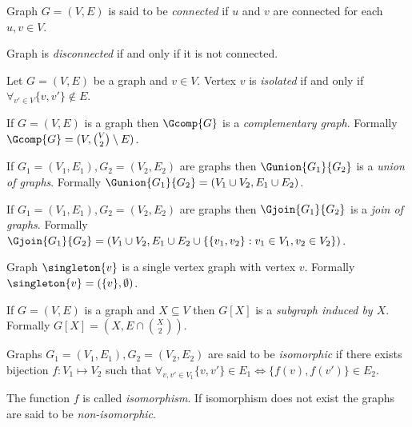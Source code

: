 \begin{defi}
    Graph $G = (V,E)$ is said to be \emph{connected} if $u$ and $v$ are connected for each $u,v \in V$.

    Graph is \emph{disconnected} if and only if it is not connected.
\end{defi}

\begin{defi}
    Let $G = (V,E)$ be a graph and $v \in V$. Vertex $v$ is \emph{isolated} if and only if $\forall_{v' \in V} \{v,v'\} \not\in E$.
\end{defi}

\begin{defi}
    If $G = (V, E)$ is a graph then $\Gcomp{G}$ is a \emph{complementary graph}. Formally $\Gcomp{G} = (V, \binom{V}{2} \setminus E)$.
\end{defi}
\begin{defi}
    If $G_1 = (V_1, E_1), G_2 = (V_2, E_2)$ are graphs then $\Gunion{G_1}{G_2}$ is a \emph{union of graphs}. Formally $\Gunion{G_1}{G_2} = (V_1 \cup V_2, E_1 \cup E_2)$.
\end{defi}
\begin{defi}
    If $G_1 = (V_1, E_1), G_2 = (V_2, E_2)$ are graphs then $\Gjoin{G_1}{G_2}$ is a \emph{join of graphs}. Formally $\Gjoin{G_1}{G_2} = (V_1 \cup V_2, E_1 \cup E_2 \cup \{\{v_1,v_2\} : v_1 \in V_1, v_2 \in V_2\})$.
\end{defi}

\begin{defi}
    Graph $\singleton{v}$ is a single vertex graph with vertex $v$. Formally $\singleton{v} = (\{v\}, \emptyset)$.
\end{defi}

\begin{defi}
    If $G = (V,E)$ is a graph and $X \subseteq V$ then $G[X]$ is a \emph{subgraph induced by $X$}. Formally $G[X] = (X, E \cap \binom{X}{2})$.
\end{defi}

\begin{defi}
    Graphs $G_1 = (V_1, E_1), G_2 = (V_2, E_2)$ are said to be \emph{isomorphic} if there exists bijection $f\colon V_1 \mapsto V_2$ such that $\forall_{v, v' \in V_1} \{v,v'\} \in E_1 \iff \{f(v), f(v')\} \in E_2$.

    The function $f$ is called \emph{isomorphism}. If isomorphism does not exist the graphs are said to be \emph{non-isomorphic}.
\end{defi}

